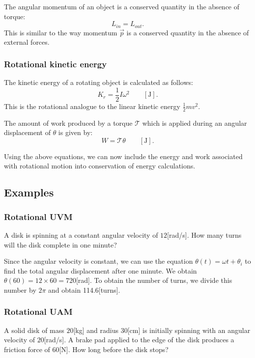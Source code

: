 \documentclass[letterpaper,9pt,journal]{IEEEtran}
\begin{document}
The angular momentum of an object is a conserved quantity in the absence of torque:
\[
 L_{in} = L_{out}.
\]
This is similar to the way momentum $\vec{p}$ is a conserved quantity 
in the absence of external forces.


\subsubsection{Rotational kinetic energy}

The kinetic energy of a rotating object is calculated as follows:
\[
 K_r = \frac{1}{2} I \omega^2 \qquad [\text{J}].
\]
This is the rotational analogue to the linear kinetic energy $\frac{1}{2}mv^2$.

The amount of work produced by a torque $\mathcal{T}$ which is
applied during an angular displacement of $\theta$ is given by:
\[ 
 W = \mathcal{T}\theta \qquad [\text{J}].
\]

Using the above equations, we can now include the energy and work
associated with rotational motion into conservation of energy calculations.


\vspace{-3mm}
\subsection{Examples}
\label{bfebe34154a0dfd9fc7b447fc9ed74e9}%

\subsubsection{Rotational UVM}

A disk is spinning at a constant angular velocity of $12$[rad/s].
How many turns will the disk complete in one minute?

Since the angular velocity is constant, we can use 
the equation $\theta(t) = \omega t + \theta_i$ to find
the total angular displacement after one minute.
We obtain $\theta(60)=12\times 60=720$[rad].
To obtain the number of turns, we divide this number
by $2\pi$ and obtain 114.6[turns].


\subsubsection{Rotational UAM}

A solid disk of mass $20$[kg] and radius $30$[cm] is initially spinning with an 
angular velocity of $20$[rad/s]. A brake pad applied to the edge of the disk
produces a friction force of 60[N]. How long before the disk stops?
\end{document}

